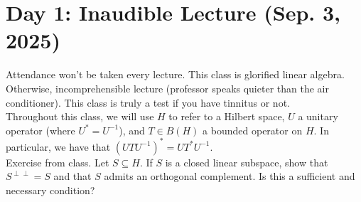 \section{Day 1: Inaudible Lecture (Sep. 3, 2025)}
Attendance won't be taken every lecture. This class is glorified linear algebra. Otherwise, incomprehensible lecture (professor speaks quieter than the air conditioner). This class is truly a test if you have tinnitus or not.
\\[8pt]
Throughout this class, we will use $H$ to refer to a Hilbert space, $U$ a unitary operator (where $U^\ast = U^{-1}$), and $T \in B(H)$ a bounded operator on $H$. In particular, we have that $(UTU^{-1})^\ast = UT^\ast U^{-1}$.
\\[8pt]
Exercise from class. Let $S \subseteq H$. If $S$ is a closed linear subspace, show that $S^{\perp \perp} = S$ and that $S$ admits an orthogonal complement. Is this a sufficient and necessary condition?